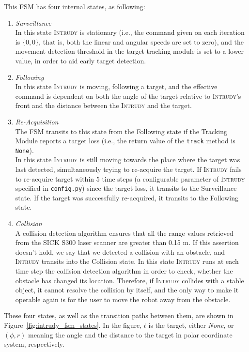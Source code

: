 \documentclass[12pt,a4paper]{scrartcl}
\newcommand{\intrudy}{\textsc{Intrudy}\xspace}
\begin{document}
	This FSM has four internal states, as following:
	\begin{enumerate}%
		\item \textit{Surveillance} \\
		In this state \intrudy is stationary (i.e., the command given on each iteration is $\{0, 0\}$, that is, both the linear and angular speeds are set to zero), and the movement detection threshold in the target tracking module is set to a lower value, in order to aid early target detection.

		\item \textit{Following} \\
		In this state \intrudy is moving, following a target, and the effective command is dependent on both the angle of the target relative to \intrudy's front and the distance between the \intrudy and the target.
		
		\item \textit{Re-Acquisition}\\
		The FSM transits to this state from the Following state if the Tracking Module reports a target loss (i.e., the return value of the \texttt{track} method is \texttt{None}).\\
		In this state \intrudy is still moving towards the place where the target was last detected, simultaneously trying to re-acquire the target. If \intrudy fails to re-acquire target within 5 time steps (a configurable parameter of \intrudy specified in \texttt{config.py}) since the target loss, it transits to the Surveillance state. If the target was successfully re-acquired, it transits to the Following state. 
		
		\item \textit{Collision}\\
		A collision detection algorithm ensures that all the range values retrieved from the SICK S300 laser scanner are greater than 0.15 m. If this assertion doesn't hold, we say that we detected a collision with an obstacle, and \intrudy transits into the Collision state. In this state \intrudy runs at each time step the collision detection algorithm in order to check, whether the obstacle has changed its location. Therefore, if \intrudy collides with a stable object, it cannot resolve the collision by itself, and the only way to make it operable again is for the user to move the robot away from the obstacle.
	\end{enumerate}

	These four states, as well as the transition paths between them, are shown in Figure~\ref{fig:intrudy_fsm_states}. In the figure, $t$ is the target, either \textit{None}, or $(\phi, r)$ meaning the angle and the distance to the target in polar coordinate system, respectively.
\end{document}
